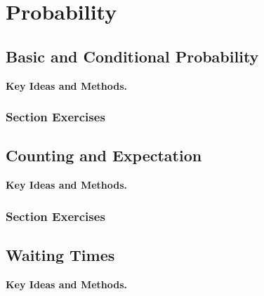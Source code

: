 \chapter{Probability}

\section{Basic and Conditional Probability}
\noindent\textbf{Key Ideas and Methods.}\enspace











\par{}
\subsection*{Section Exercises}



\section{Counting and Expectation}
\noindent\textbf{Key Ideas and Methods.}\enspace















\par{}
\subsection*{Section Exercises}




\section{Waiting Times}
\noindent\textbf{Key Ideas and Methods.}\enspace










\par{}
